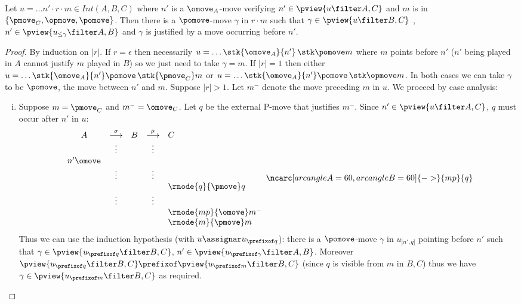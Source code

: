 \begin{lemma}
\label{lem:middlepomove}
Let $u = \ldots n' \cdot r \cdot m \in Int(A,B,C)$ where
$n'$ is a $\omove_A$-move verifying $n' \in \pview{u\filter A,C}$ and $m$ is in $\{ \pmove_C, \opmove, \pomove \}$. Then there is a $\pomove$-move $\gamma$ in $r \cdot m$ such that $\gamma \in \pview{u\filter B,C}$ , $n' \in \pview{u_{\leq \gamma} \filter A,B}$ and $\gamma$ is justified by a move occurring before $n'$.
\end{lemma}
\begin{proof}
By induction on $|r|$.
If $r=\epsilon$ then necessarily $u = \ldots \stk{\omove_A}{n'} \thinspace\stk \pomove m$ where $m$ points before $n'$ ($n'$ being played in $A$ cannot justify $m$ played in $B$) so we just need to take $\gamma = m$.
If $|r|=1$ then either
$u = \ldots \stk{\omove_A}{n'} \pomove\thinspace\stk {\pmove_C} m$
or $u = \ldots \stk{\omove_A}{n'} \pomove\thinspace\stk \opmove m$.
In both cases we can take $\gamma$ to be $\pomove$, the move between $n'$ and $m$.
Suppose $|r|>1$. Let $m^-$ denote the move preceding $m$ in $u$.
We proceed by case analysis:
\begin{enumerate}[i.]
\item Suppose $m = \pmove_C$ and $m^- = \omove_C$.
Let $q$ be the external P-move that justifies $m^-$.
Since $n' \in \pview{u\filter A,C}$, $q$ must occur after $n'$ in $u$:
$$
\begin{array}{ccccl}
A & \stackrel\sigma{\longrightarrow} & B & \stackrel\mu{\longrightarrow} & C \\
&\vdots&&\vdots\\
n' \omove\\
&\vdots&&\vdots  \\
&& & &  \rnode{q}{\pmove}q  \\
&\vdots&&\vdots  \\
&& & &  \rnode{mp}{\omove}m^-  \\
&& & &  \rnode{m}{\pmove}m  \\
\end{array}
\ncarc[arcangleA=60,arcangleB=60]{->}{mp}{q}
 $$
Thus we can use the induction hypothesis (with $u\assignar u_{\prefixof q}$): there is a $\pomove$-move $\gamma$
in $u_{]n',q]}$ pointing before $n'$ such that $\gamma \in \pview{u_{\prefixof q} \filter B,C}$, $n' \in \pview{u_{\prefixof \gamma} \filter A,B}$.
Moreover $\pview{u_{\prefixof q} \filter B,C} \prefixof \pview{u_{\prefixof m} \filter B,C}$ (since $q$ is visible from $m$ in $B,C$) thus we have $\gamma \in \pview{u_{\prefixof m} \filter B,C}$ as required.


\end{enumerate}
\end{proof}
